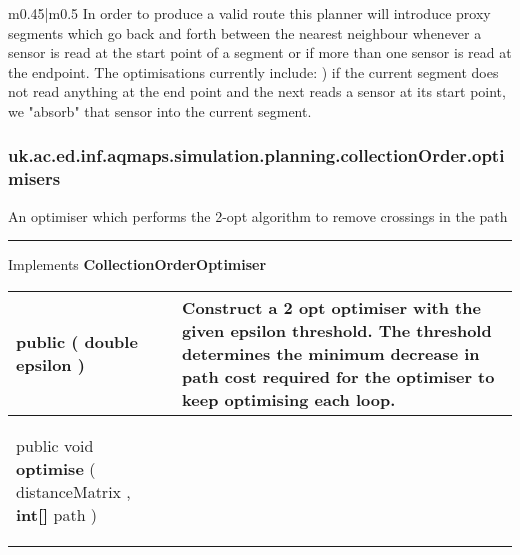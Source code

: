 {\begin{tabularx}{\linewidth}{m{0.45\textwidth}|m{0.5\textwidth}}
 In order to produce a valid route this planner will introduce proxy segments which go back and forth between the nearest neighbour\newline%
 whenever a sensor is read at the start point of a segment or if more than one sensor is read at the endpoint. The optimisations currently include:\newline%
  ) if the current segment does not read anything at the end point and the next reads a sensor at its start point, we "absorb" that sensor into\newline%
 the current segment.\\\end{tabularx}
}
\subsubsection*{ uk.ac.ed.inf.aqmaps.simulation.planning.collectionOrder.optimisers }
 {\scriptsize An optimiser which performs the 2{-}opt algorithm to remove crossings in the path
 
\vspace*{4pt} \hrule \vspace*{3pt}
Implements \textbf{ CollectionOrderOptimiser }
\vspace*{-5pt} 
\begin{tabularx}{\linewidth}{m{}|m{}}
\label{tab:Optimiser2Opt}
\begin{raggedleft}public  \textbf{\hyperref[tab:Optimiser2Opt]{\color{blue}{Optimiser2Opt}} }(\hspace*{ 5pt} \textbf{double} epsilon  )
\end{raggedleft} &
 Construct a 2 opt optimiser with the given epsilon threshold. The threshold determines the minimum decrease in path cost required for the optimiser to keep optimising each loop.\\ \hline 
\begin{raggedleft}public void \textbf{optimise }(\newline \hfill 
\hspace*{ 5pt} \textbf{\hyperref[tab:DistanceMatrix]{\color{blue}{DistanceMatrix}}} distanceMatrix , \newline
 \hspace*{ 5pt} \textbf{int{[}{]}} path  )
\end{raggedleft} &
 \\\end{tabularx}
}
